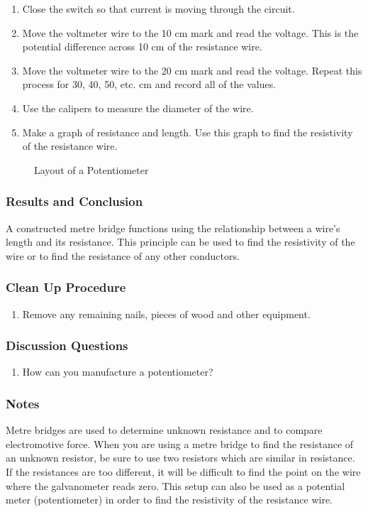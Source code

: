 \begin{enumerate}
\item{Close the switch so that current is moving through the circuit.} 
\item{Move the voltmeter wire to the 10 cm mark and read the voltage. This is the potential difference across 10 cm of the resistance wire.} 
\item{Move the voltmeter wire to the 20 cm mark and read the voltage. Repeat this process for 30, 40, 50, etc. cm and record all of the values.} 
\item{Use the calipers to measure the diameter of the wire.} 
\item{Make a graph of resistance and length. Use this graph to find the resistivity of the resistance wire.} 
\end{enumerate}

\begin{figure}
\begin{center}
\def\svgwidth{2cm}

\caption{Layout of a Potentiometer}
\label{fig:potential-metre}
\end{center}
\end{figure}


\subsubsection*{Results and Conclusion}
A constructed metre bridge functions using the relationship between a wire's length and its resistance. This principle can be used to find the resistivity of the wire or to find the resistance of any other conductors.  

\subsubsection*{Clean Up Procedure}
\begin{enumerate}
\item{Remove any remaining nails, pieces of wood and other equipment.} 
\end{enumerate}

\subsubsection*{Discussion Questions}
\begin{enumerate}
\item{How can you manufacture a potentiometer?}
\end{enumerate}

\subsubsection*{Notes}
Metre bridges are used to determine unknown resistance and to compare electromotive force.  When you are using a metre bridge to find the resistance of an unknown resistor, be sure to use two resistors which are similar in resistance.  If the resistances are too different, it will be difficult to find the point on the wire where the galvanometer reads zero.
This setup can also be used as a potential meter (potentiometer) in order to find the resistivity of the resistance wire.  

